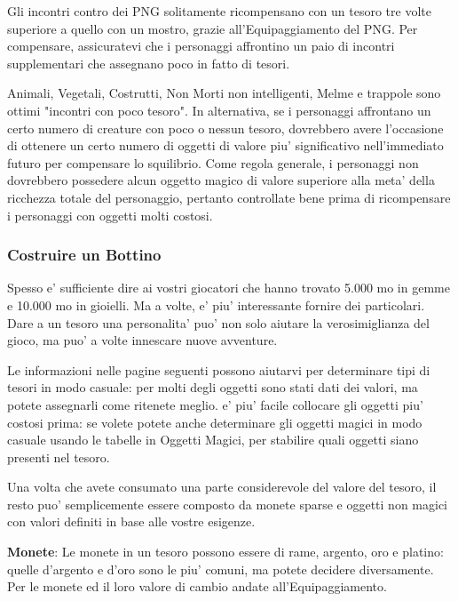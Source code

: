 \documentclass[a4paper,11pt,twoside,openany]{book}
\begin{document}
{		\bigskip
		
		Gli incontri contro dei PNG solitamente ricompensano con un tesoro
		tre volte superiore a quello con un mostro, grazie all'Equipaggiamento
		del PNG. Per compensare, assicuratevi che i personaggi affrontino
		un paio di incontri supplementari che assegnano poco in fatto di tesori.
		
		Animali, Vegetali, Costrutti, Non Morti non intelligenti, Melme e trappole sono ottimi "incontri con poco tesoro". In alternativa, se i personaggi affrontano un certo numero di creature con poco o nessun tesoro, dovrebbero avere l'occasione di ottenere un certo numero di oggetti di valore piu' significativo nell'immediato futuro per compensare lo squilibrio. Come regola generale, i personaggi non dovrebbero possedere alcun oggetto magico di valore superiore alla meta' della ricchezza totale del personaggio, pertanto controllate bene prima di ricompensare i personaggi con oggetti molti costosi.
		
		\subsubsection{Costruire un Bottino}
		
		Spesso e' sufficiente dire ai vostri giocatori che hanno trovato 5.000
		mo in gemme e 10.000 mo in gioielli. Ma a volte, e' piu' interessante
		fornire dei particolari. Dare a un tesoro una personalita' puo' non
		solo aiutare la verosimiglianza del gioco, ma puo' a volte innescare
		nuove avventure.
		
		Le informazioni nelle pagine seguenti possono aiutarvi per determinare tipi di tesori in modo casuale: per molti degli oggetti sono stati dati dei valori, ma potete assegnarli come ritenete meglio. e' piu' facile collocare gli oggetti piu' costosi prima: se volete potete anche determinare gli oggetti magici in modo casuale usando le tabelle in Oggetti Magici, per stabilire quali oggetti siano presenti nel tesoro.
		
		Una volta che avete consumato una parte considerevole del valore del tesoro, il resto puo' semplicemente essere composto da monete sparse e oggetti non magici con valori definiti in base alle vostre esigenze.
		
		\textbf{Monete}: Le monete in un tesoro possono essere di rame, argento, oro e platino: quelle d'argento e d'oro sono le piu' comuni, ma potete decidere diversamente. Per le monete ed il loro valore di cambio andate all'Equipaggiamento.
		
}
\end{document}

